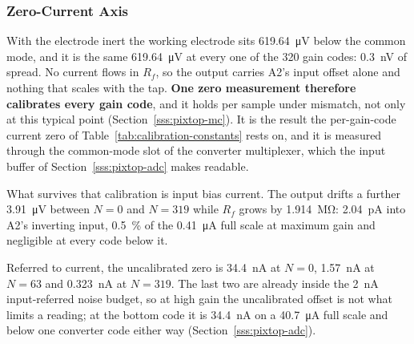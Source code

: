 
\subsubsection{Zero-Current Axis}\label{sss:pixtop-zero}

With the electrode inert the working electrode sits \SI{619.64}{\micro\volt}
below the common mode, and it is the same \SI{619.64}{\micro\volt} at every one
of the 320 gain codes: \SI{0.3}{\nano\volt} of spread. No current flows in
\(R_f\), so the output carries A2's input offset alone and nothing that scales
with the tap. \textbf{One zero measurement therefore calibrates every gain
code}, and it holds per sample under mismatch, not only at this typical
point (Section~\ref{sss:pixtop-mc}). It is the result the per-gain-code current zero of
Table~\ref{tab:calibration-constants} rests on, and it is measured through the
common-mode slot of the converter multiplexer, which the input buffer of
Section~\ref{sss:pixtop-adc} makes readable.

What survives that calibration is input bias current. The output drifts a
further \SI{3.91}{\micro\volt} between \(N = 0\) and \(N = 319\) while \(R_f\)
grows by \SI{1.914}{\mega\ohm}: \SI{2.04}{\pico\ampere} into A2's inverting
input, \SI{0.5}{\percent} of the \SI{0.41}{\micro\ampere} full scale at maximum
gain and negligible at every code below it.

Referred to current, the uncalibrated zero is \SI{34.4}{\nano\ampere} at
\(N = 0\), \SI{1.57}{\nano\ampere} at \(N = 63\) and
\SI{0.323}{\nano\ampere} at \(N = 319\). The last two are already inside the
\SI{2}{\nano\ampere} input-referred noise budget, so at high gain the
uncalibrated offset is not what limits a reading; at the bottom code it is
\SI{34.4}{\nano\ampere} on a \SI{40.7}{\micro\ampere} full scale and below one
converter code either way (Section~\ref{sss:pixtop-adc}).
